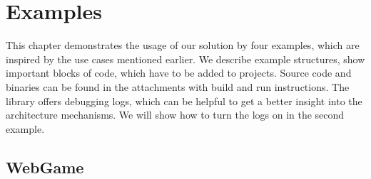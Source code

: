 \chapter{Examples}

This chapter demonstrates the usage of our solution by four examples, which are inspired by the use cases mentioned earlier.
We describe example structures, show important blocks of code, which have to be added to projects.
Source code and binaries can be found in the attachments with build and run instructions.
The library offers debugging logs, which can be helpful to get a better insight into the architecture mechanisms.
We will show how to turn the logs on in the second example.

\section{WebGame}

